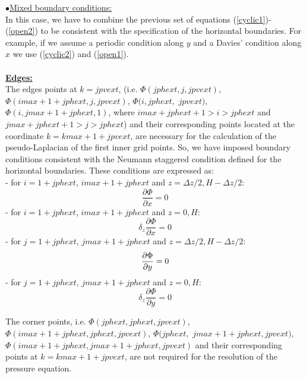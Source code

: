 $\bullet$\underline{Mixed boundary conditions:}\\
In this case, we have to combine the previous set of equations (\ref{cyclic1})-
(\ref{open2}) to be consistent with the specification of the horizontal
boundaries. For example, if we assume a periodic condition along $y$ and a
Davies' condition along $x$ we use (\ref{cyclic2}) and (\ref{open1}).\\
\\
\underline {\bf Edges:}\\
The edges points at $k = jpvext$, (i.e. $\Phi (jphext, j, jpvext)$,
$\Phi (imax+1+jphext, j, jpvext)$, $\Phi (i, jphext,$  $jpvext)$,
$\Phi (i, jmax+1+jphext, 1)$, where $imax+jphext+1> i >  jphext$ and
$jmax+jphext+1 > j > jphext$) and their corresponding points located at the
coordinate $k = kmax+1+jpvext$, are necessary for the calculation of the
pseudo-Laplacian of the first inner grid points. So, we have imposed boundary
conditions consistent with the Neumann staggered condition defined for the
horizontal boundaries. These conditions are expressed as:\\
- for $i=1+jphext$, $imax+1+jphext$ and $z = \Delta z/2, H-\Delta z/2$:
\begin{displaymath}
\dfrac{\partial{\Phi } } {\partial{x} } = 0
\end{displaymath}
- for $i=1+jphext$, $imax+1+jphext$ and $z = 0, H$:
\begin{displaymath}
\delta _z \dfrac{\partial{\Phi } } {\partial{x} } = 0
\end{displaymath}
- for $j=1+jphext$, $jmax+1+jphext$ and $z = \Delta z/2, H - \Delta z/2$:
\begin{displaymath}
\dfrac{\partial{\Phi } } {\partial{y} } = 0 \\
\end{displaymath}
- for $j=1+jphext$, $jmax+1+jphext$ and $z = 0, H$:
\begin{displaymath}
\delta _z \dfrac{\partial{\Phi } } {\partial{y} } = 0
\end{displaymath}

\par The corner points, i.e. $\Phi (jphext, jphext, jpvext)$,
$\Phi (imax+1+jphext, jphext, jpvext)$, $\Phi (jphext,$ $jmax+1+jphext, jpvext)$,
$\Phi (imax+1+jphext, jmax+1+jphext, jpvext)$ and
their corresponding points at $k = kmax+1+jpvext$, are not required for the
resolution of the pressure equation.
